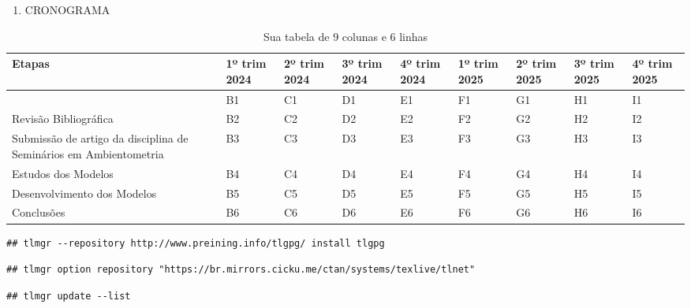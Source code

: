\documentclass[
]{article}
\providecommand{\tightlist}{%
  \setlength{\itemsep}{0pt}\setlength{\parskip}{0pt}}
\begin{document}
\begin{enumerate}
\def\labelenumi{\arabic{enumi}.}
\setcounter{enumi}{5}
\tightlist
\item
  CRONOGRAMA
\end{enumerate}

\begin{table}[ht]
\centering
\begin{tabular}{|p{3cm}|p{1.5cm}|p{1.5cm}|p{1.5cm}|p{1.5cm}|p{1.5cm}|p{1.5cm}|p{1.5cm}|p{1.5cm}|}
\hline
Etapas & 1º trim 2024 & 2º trim 2024 & 3º trim 2024 & 4º trim 2024 & 1º trim 2025 & 2º trim 2025 & 3º trim 2025 & 4º trim 2025 \\ \hline
   & B1   & C1   & D1   & E1   & F1   & G1   & H1   & I1   \\ \hline
Revisão Bibliográfica   & B2   & C2   & D2   & E2   & F2   & G2   & H2   & I2   \\ \hline
Submissão de artigo da
disciplina de Seminários
em Ambientometria& B3   & C3   & D3   & E3   & F3   & G3   & H3   & I3   \\ \hline
Estudos dos Modelos   & B4   & C4   & D4   & E4   & F4   & G4   & H4   & I4   \\ \hline
Desenvolvimento dos
Modelos& B5   & C5   & D5   & E5   & F5   & G5   & H5   & I5   \\ \hline
Conclusões   & B6   & C6   & D6   & E6   & F6   & G6   & H6   & I6   \\ \hline
\end{tabular}
\caption{Sua tabela de 9 colunas e 6 linhas}
\end{table}

\begin{verbatim}
## tlmgr --repository http://www.preining.info/tlgpg/ install tlgpg
\end{verbatim}

\begin{verbatim}
## tlmgr option repository "https://br.mirrors.cicku.me/ctan/systems/texlive/tlnet"
\end{verbatim}

\begin{verbatim}
## tlmgr update --list
\end{verbatim}
\end{document}
